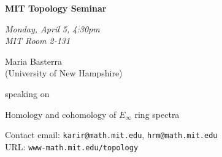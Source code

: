 \documentclass{slides}
\begin{document}
\begin{center}

{\fontsize {54pt}{40pt}\selectfont

\textrm{
{\textbf{MIT Topology Seminar}}}
}
\medskip


{\large\textrm{\emph{Monday, April 5, 4:30pm\\MIT Room 2-131}}}



\bigskip

\textrm{{\LARGE Maria Basterra  \\[.5cm](University of New Hampshire)}}

\bigskip\bigskip\bigskip
\textrm{speaking on}
\bigskip\bigskip\bigskip

\textrm{\LARGE Homology and cohomology of $E_{\infty}$ ring spectra}\\

\end{center}

\vspace{1cm}

{\small
\textrm{Contact email: } \texttt{karir@math.mit.edu}, \texttt{hrm@math.mit.edu}\\
\textrm{URL: } \texttt{www-math.mit.edu/topology}
}
\end{document}
